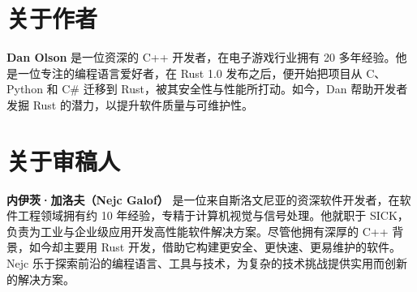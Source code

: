 \section{关于作者}
\textbf{Dan Olson} 是一位资深的 C++ 开发者，在电子游戏行业拥有 20 多年经验。他是一位专注的编程语言爱好者，在 Rust 1.\allowbreak{}0 发布之后，便开始把项目从 C、Python 和 C\# 迁移到 Rust，被其安全性与性能所打动。如今，Dan 帮助开发者发掘 Rust 的潜力，以提升软件质量与可维护性。
\section{关于审稿人}
\textbf{内伊茨·加洛夫（Nejc Galof）} 是一位来自斯洛文尼亚的资深软件开发者，在软件工程领域拥有约 10 年经验，专精于计算机视觉与信号处理。他就职于 SICK，负责为工业与企业级应用开发高性能软件解决方案。尽管他拥有深厚的 C++ 背景，如今却主要用 Rust 开发，借助它构建更安全、更快速、更易维护的软件。Nejc 乐于探索前沿的编程语言、工具与技术，为复杂的技术挑战提供实用而创新的解决方案。
